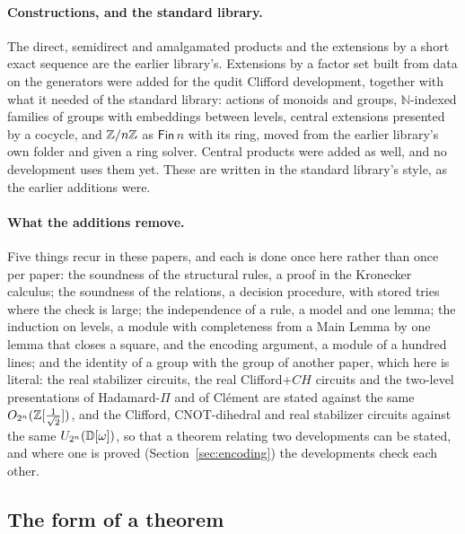 \paragraph{Constructions, and the standard library.} The direct,
semidirect and amalgamated products and the extensions by a short
exact sequence are the earlier library's. Extensions by a factor set
built from data on the generators were added for the qudit Clifford
development, together with what it needed of the standard library:
actions of monoids and groups, $\mathbb{N}$-indexed families of groups
with embeddings between levels, central extensions presented by a
cocycle, and $\mathbb{Z}/n\mathbb{Z}$ as $\mathsf{Fin}\,n$ with its ring, moved from
the earlier library's own folder and given a ring solver. Central
products were added as well, and no development uses them yet. These
are written in the standard library's style, as the earlier additions
were.

\paragraph{What the additions remove.} Five things recur in these
papers, and each is done once here rather than once per paper: the
soundness of the structural rules, a proof in the Kronecker calculus;
the soundness of the relations, a decision procedure, with stored
tries where the check is large; the independence of a rule, a model and
one lemma; the induction on levels, a module with completeness from a
Main Lemma by one lemma that closes a square, and the encoding
argument, a module of a hundred lines; and the identity of a group
with the group of another paper, which here is literal: the real
stabilizer circuits, the real Clifford+$CH$ circuits and the two-level
presentations of Hadamard-$\Pi$ and of Cl\'ement are stated against the
same $O_{2^n}(\mathbb{Z}[\frac1{\sqrt2}])$, and the Clifford, CNOT-dihedral and
real stabilizer circuits against the same $U_{2^n}(\mathbb{D}[\omega])$, so
that a theorem relating two developments can be stated, and where one
is proved (Section~\ref{sec:encoding}) the developments check each
other.



\subsection{The form of a theorem}\label{sec:theorem-form}

